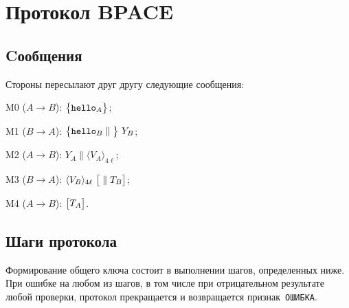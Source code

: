 \section{Протокол BPACE}\label{PACE}

\subsection{Cообщения}\label{PACE.Messages}

Стороны пересылают друг другу следующие сообщения:

M0 ($A\to B$): 
$\mathbf{\bigl\{}\texttt{hello}_A\mathbf{\bigr\}}$;

M1 ($B\to A$): 
$\mathimplicit{\hello_B\parallel}\ 
Y_B$;

M2 ($A\to B$): 
$Y_A\parallel\langle V_A\rangle_{4\ell}$;

M3 ($B\to A$): 
$\langle V_B\rangle_{4\ell}\ \mathoptional{\parallel T_B}$;

M4 ($A\to B$): 
$\mathbf{\bigl[}T_A\mathbf{\bigr]}$.

\subsection{Шаги протокола}\label{PACE.Steps}

Формирование общего ключа состоит в выполнении шагов,
определенных ниже. При ошибке на любом из шагов,
в том числе при отрицательном результате любой проверки, 
протокол прекращается и возвращается признак~\texttt{ОШИБКА}.

